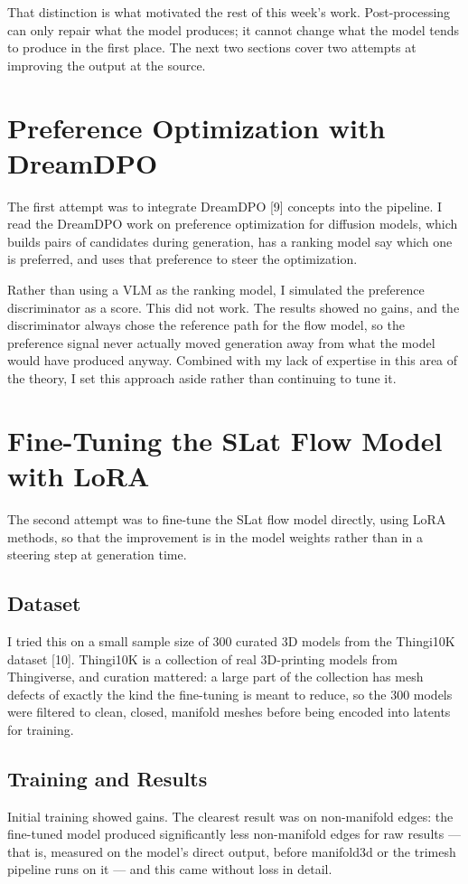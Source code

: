 \documentclass[11pt,a4paper]{article}
\begin{document}
That distinction is what motivated the rest of this week's work. Post-processing can only repair what the model produces; it cannot change what the model tends to produce in the first place. The next two sections cover two attempts at improving the output at the source.


\section{Preference Optimization with DreamDPO}
The first attempt was to integrate DreamDPO [9] concepts into the pipeline. I read the DreamDPO work on preference optimization for diffusion models, which builds pairs of candidates during generation, has a ranking model say which one is preferred, and uses that preference to steer the optimization.

Rather than using a VLM as the ranking model, I simulated the preference discriminator as a score. This did not work. The results showed no gains, and the discriminator always chose the reference path for the flow model, so the preference signal never actually moved generation away from what the model would have produced anyway. Combined with my lack of expertise in this area of the theory, I set this approach aside rather than continuing to tune it.


\section{Fine-Tuning the SLat Flow Model with LoRA}
The second attempt was to fine-tune the SLat flow model directly, using LoRA methods, so that the improvement is in the model weights rather than in a steering step at generation time.

\subsection{Dataset}
I tried this on a small sample size of 300 curated 3D models from the Thingi10K dataset [10]. Thingi10K is a collection of real 3D-printing models from Thingiverse, and curation mattered: a large part of the collection has mesh defects of exactly the kind the fine-tuning is meant to reduce, so the 300 models were filtered to clean, closed, manifold meshes before being encoded into latents for training.

\subsection{Training and Results}
Initial training showed gains. The clearest result was on non-manifold edges: the fine-tuned model produced significantly less non-manifold edges for raw results --- that is, measured on the model's direct output, before manifold3d or the trimesh pipeline runs on it --- and this came without loss in detail.
\end{document}
